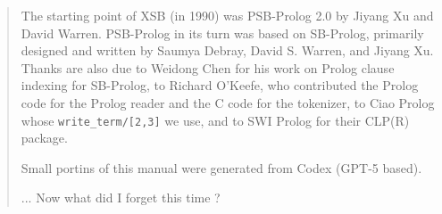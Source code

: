 \begin{quote}
The starting point of XSB (in 1990) was PSB-Prolog 2.0 by Jiyang Xu
and David Warren.  PSB-Prolog in its turn was based on SB-Prolog,
primarily designed and written by Saumya Debray, David S. Warren, and
Jiyang Xu.  Thanks are also due to Weidong Chen for his work on Prolog
clause indexing for SB-Prolog, to Richard O'Keefe, who contributed the
Prolog code for the Prolog reader and the C code for the tokenizer, to
Ciao Prolog whose {\tt write\_term/[2,3]} we use, and to SWI Prolog
for their CLP(R) package.

Small portins of this manual were generated from Codex (GPT-5 based).

... Now what did I forget this time ?

\end{quote}

